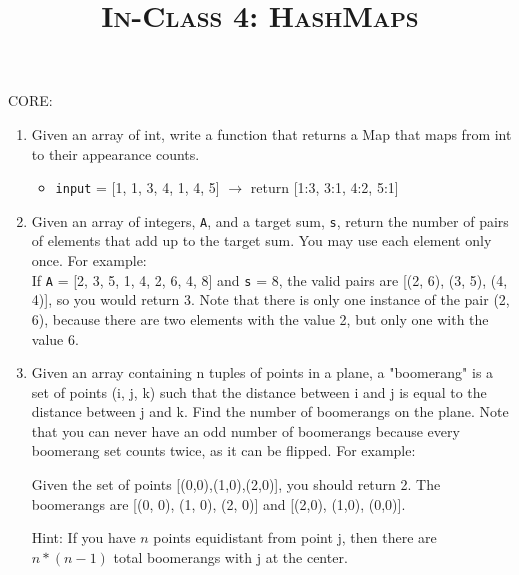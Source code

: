 \documentclass{article}
\title{\large{\textsc{In-Class 4: HashMaps}}}
\date{}
\begin{document}
    \maketitle

    \subsection*{}

    CORE:
    \begin{enumerate}
        \item Given an array of int, write a function that returns a Map that maps from int to their appearance counts.
        \begin{itemize}
            \item \texttt{input} = [1, 1, 3, 4, 1, 4, 5] $\rightarrow$ return [1:3, 3:1, 4:2, 5:1]
        \end{itemize}


        \item Given an array of integers, \texttt{A}, and a target sum, \texttt{s}, return the number of pairs of elements that add up to the target sum.  You may use each element only once.  For example: \\

        If \texttt{A} = [2, 3, 5, 1, 4, 2, 6, 4, 8] and \texttt{s} = 8, the valid pairs are [(2, 6), (3, 5), (4, 4)], so you would return 3.  Note that there is only one instance of the pair (2, 6), because there are two elements with the value 2, but only one with the value 6. \\


        \item Given an array containing n tuples of points in a plane, a "boomerang" is a set of points (i, j, k) such that the distance between i and j is equal to the distance between j and k.  Find the number of boomerangs on the plane. Note that you can never have an odd number of boomerangs because every boomerang set counts twice, as it can be flipped. For example:

        Given the set of points [(0,0),(1,0),(2,0)], you should return 2.  The boomerangs are [(0, 0), (1, 0), (2, 0)] and [(2,0), (1,0), (0,0)].

        Hint: If you have $n$ points equidistant from point j, then there are $n*(n-1)$ total boomerangs with j at the center.

    \end{enumerate}
\end{document}

